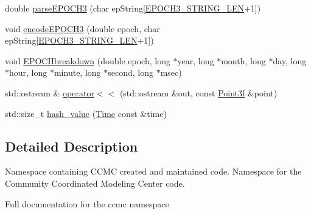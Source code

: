 \begin{DoxyCompactItemize}
double \hyperlink{namespaceccmc_a17625a00cb5c6d62f957839dcfabf7dd}{parse\-E\-P\-O\-C\-H3} (char ep\-String\mbox{[}\hyperlink{_kameleon_8h_a6f9c7e3353c7eb6333adaa96be43edab}{E\-P\-O\-C\-H3\-\_\-\-S\-T\-R\-I\-N\-G\-\_\-\-L\-E\-N}+1\mbox{]})
\item 
void \hyperlink{namespaceccmc_a07dfb0ccd6e3ff58181ad54f151e1c3a}{encode\-E\-P\-O\-C\-H3} (double epoch, char ep\-String\mbox{[}\hyperlink{_kameleon_8h_a6f9c7e3353c7eb6333adaa96be43edab}{E\-P\-O\-C\-H3\-\_\-\-S\-T\-R\-I\-N\-G\-\_\-\-L\-E\-N}+1\mbox{]})
\item 
void \hyperlink{namespaceccmc_a865f02361d01e00b2280b3b729bf6a34}{E\-P\-O\-C\-Hbreakdown} (double epoch, long $\ast$year, long $\ast$month, long $\ast$day, long $\ast$hour, long $\ast$minute, long $\ast$second, long $\ast$msec)
\item 
std\-::ostream \& \hyperlink{namespaceccmc_a447a43508de96a63d12aae7c85aaa06b}{operator$<$$<$} (std\-::ostream \&out, const \hyperlink{classccmc_1_1_point3f}{Point3f} \&point)
\item 
std\-::size\-\_\-t \hyperlink{namespaceccmc_a12a62484d27726b55814a116018d6434}{hash\-\_\-value} (\hyperlink{classccmc_1_1_time}{Time} const \&time)
\end{DoxyCompactItemize}


\subsection{Detailed Description}
Namespace containing C\-C\-M\-C created and maintained code. Namespace for the Community Coordinated Modeling Center code.

Full documentation for the ccmc namespace 

